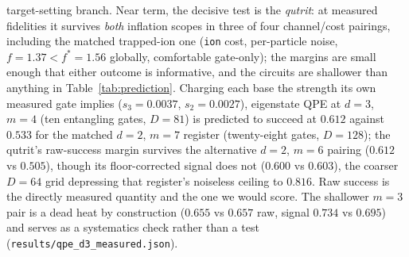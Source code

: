 \documentclass[aps,pra,reprint,superscriptaddress,nofootinbib,floatfix]{revtex4-2}
\begin{document}
target-setting branch. Near term, the decisive test is the
\emph{qutrit}: at measured fidelities it survives \emph{both}
inflation scopes in three of four channel/cost pairings, including
the matched trapped-ion one (\texttt{ion} cost, per-particle
noise, $f=1.37<f^\ast=1.56$ globally, comfortable gate-only); the
margins are small enough that either
outcome is informative, and the circuits are shallower than anything
in Table~\ref{tab:prediction}. Charging each base the strength its own
measured gate implies ($s_3=0.0037$, $s_2=0.0027$), eigenstate QPE at
$d=3$, $m=4$ (ten entangling gates, $D=81$) is predicted to succeed at
$0.612$ against $0.533$ for the matched $d=2$, $m=7$ register
(twenty-eight gates, $D=128$); the qutrit's raw-success margin
survives the alternative $d=2$, $m=6$ pairing ($0.612$ vs $0.505$),
though its floor-corrected signal does not ($0.600$ vs $0.603$), the
coarser $D=64$ grid depressing that register's noiseless ceiling to
$0.816$. Raw success is the directly measured quantity and the one we
would score. The shallower $m=3$ pair is a dead heat by construction
($0.655$ vs $0.657$ raw, signal $0.734$ vs $0.695$) and serves as a
systematics check rather than a test
(\texttt{results/qpe\_d3\_measured.json}).
\end{document}
